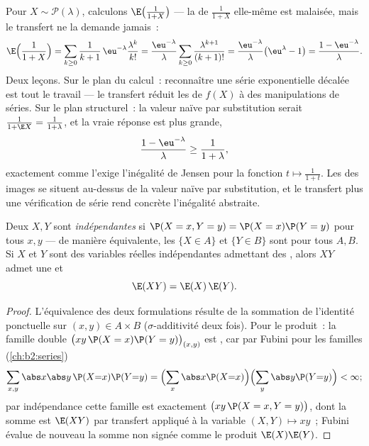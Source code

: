 \begin{example}\label{ex:b2:randomvar:transferex}
Pour $X \sim \mathcal P(\lambda)$, calculons
$\E\bigl(\frac1{1+X}\bigr)$ --- la  de $\frac1{1+X}$
elle-même est malaisée, mais le transfert ne la demande jamais~:
\[
\E\Bigl(\frac1{1+X}\Bigr)
= \sum_{k\geq0}\frac{1}{k+1}\,\eu^{-\lambda}
\frac{\lambda^k}{k!}
= \frac{\eu^{-\lambda}}{\lambda}\sum_{k\geq0}
\frac{\lambda^{k+1}}{(k+1)!}
= \frac{\eu^{-\lambda}}{\lambda}\bigl(\eu^\lambda - 1\bigr)
= \frac{1 - \eu^{-\lambda}}{\lambda} .
\]
Deux leçons. Sur le plan du calcul~: reconnaître une série
exponentielle décalée est tout le travail --- le transfert réduit
les  de $f(X)$ à des manipulations de séries. Sur le plan
structurel~: la valeur naïve par substitution serait $\frac1{1 + \E X} =
\frac1{1 + \lambda}$, et la vraie réponse est plus grande,
\[
\frac{1 - \eu^{-\lambda}}{\lambda} \geq
\frac{1}{1 + \lambda},
\]
exactement comme l'exige l'inégalité de Jensen pour la fonction
 $t \mapsto \frac1{1+t}$. Les  des images 
se situent au-dessus de la valeur naïve par substitution, et le
transfert plus une vérification de série rend concrète l'inégalité
abstraite.
\end{example}

\begin{theorem}\label{thm:b2:randomvar:product}
Deux  $X, Y$ sont \emph{indépendantes} si $\P(X = x, Y =
y) = \P(X = x)\P(Y = y)$ pour tous $x, y$ --- de manière équivalente, les
 $\{X \in A\}$ et $\{Y \in B\}$ sont  pour tous $A,
B$. Si $X$ et $Y$ sont des variables réelles indépendantes admettant des
, alors $XY$ admet une  et
\[
\E(XY) = \E(X)\,\E(Y) .
\]
\end{theorem}

\begin{proof}
L'équivalence des deux formulations résulte de la sommation de
l'identité ponctuelle sur $(x, y) \in A \times B$
($\sigma$-additivité deux fois). Pour le produit~: la famille double
$\bigl(xy\,\P(X = x)\P(Y = y)\bigr)_{(x,y)}$ est , car par
Fubini pour les familles (\cref{ch:b2:series})
\[
\sum_{x, y}\abs x \abs y\,\P(X{=}x)\P(Y{=}y)
= \Bigl(\sum_x \abs x \P(X{=}x)\Bigr)
\Bigl(\sum_y \abs y \P(Y{=}y)\Bigr) < \infty ;
\]
par indépendance cette famille est exactement $\bigl(xy\,\P(X = x, Y =
y)\bigr)$, dont la somme est $\E(XY)$ par transfert appliqué à la
variable $(X, Y) \mapsto xy$~; Fubini évalue de nouveau la somme non
signée comme le produit $\E(X)\E(Y)$.
\end{proof}

